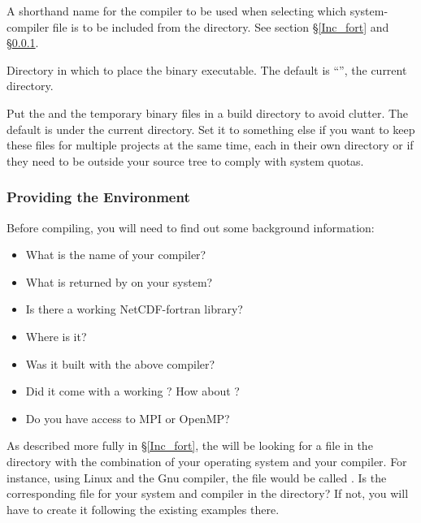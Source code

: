 \begin{klist}
 A shorthand name for the compiler to be used when
selecting which system-compiler file is to be included from the
 directory. See section \S\ref{Inc_fort} and
\S\ref{make_env}.

 \mbox{}

\begin{klist}
   Directory in which to place the binary executable.
The default is ``'', the current directory.

   Put the  and the temporary binary files
in a build directory to avoid clutter. The default is 
under the current directory. Set it to something else if you want
to keep these files for multiple projects at the same time, each in
their own directory or if they need to be outside your source tree to
comply with system quotas.
\end{klist}
\end{klist}

\subsubsection{Providing the Environment}
\label{make_env}

Before compiling, you will need to find out some background information:
\begin{itemize}
 \item What is the name of your compiler?
 \item What is returned by  on your system?
 \item Is there a working NetCDF-fortran library?
 \item Where is it?
 \item Was it built with the above compiler?
 \item Did it come with a working ? How about
 ?
 \item Do you have access to MPI or OpenMP?
\end{itemize}
As described more fully in \S\ref{Inc_fort}, the  will be
looking for a file in the  directory with the
combination of your operating system and your compiler. For
instance, using Linux and the Gnu compiler, the file would be
called . Is the corresponding file for your
system and compiler in the  directory? If not, you
will have to create it following the existing examples there.

